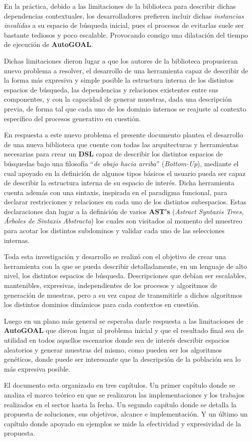 En la práctica, debido a las limitaciones de la biblioteca para describir dichas
dependencias contextuales, los desarrolladores prefieren incluir dichas {\it instancias
        invalidas} a su espacio de búsqueda inicial, pues el procesos de evitarlas suele
ser bastante tediosos y poco escalable. Provocando consigo una dilatación del
tiempo de ejecución de {\bf AutoGOAL}.

Dichas limitaciones dieron lugar a que los autores de la biblioteca propusieran
nuevo problema a resolver, el desarrollo de una herramienta capaz de describir de
la forma más expresiva y simple posible la estructura interna de los
distintos espacios de búsqueda, las dependencias y relaciones existentes entre sus
componentes, y con la capacidad de generar muestras, dada una descripción
previa, de forma tal que cada uno de los dominio internos se reajuste al contexto
específico del procesos generativo en cuestión.

En respuesta a este nuevo problema el presente documento plantea el desarrollo de una
nueva biblioteca que cuente con todas las arquitecturas y herramientas necesarias para
crear un {\bf DSL} capaz de describir los distintos espacios de búsquedas bajo una
filosofía ``{\it de abajo hacia arriba}'' ({\it Bottom-Up}), mediante el cual apoyado
en la definición de algunos tipos básicos el usuario pueda ser capaz de describir la
estructura interna de su espacio de interés. Dicha herramienta cuenta además con una
sintaxis, inspirada en el paradigma funcional, para declarar restricciones y
relaciones en cada uno de los distintos subespacios. Estas declaraciones dan lugar a la
definición de varios {\bf AST's} ({\it Astract Syntaxis Trees, Árboles de Sintaxis
        Abstracta}) los cuales son visitados al momento del muestreo para acotar los distintos
subdominos y validar cada uno de las selecciones internas.

Toda esta investigación y desarrollo se realizó con el objetivo de crear una
herramienta con la que se pueda describir detalladamente, en un lenguaje de alto nivel,
los distintos espacios de búsqueda. Descripciones que debían ser escalables, mantenibles,
expresivas, independientes de los procesos y algoritmos de generación de muestras, pero a
su vez capaz de transmitirle a dichos algoritmos los distintos dominios dinámicos para
cada contextos en cuestión.

Luego en un plano más general se esperaba darle respuesta a las limitaciones
de {\bf AutoGOAL} que dieron lugar al problema inicial y que el resultado final sea
de utilidad en todos aquellos escenarios donde sea de interés describir espacios
aleatorios y generar muestras del mismo, como pueden ser los algoritmos genéticos,
donde puede ser interesante que la descripción de la población sea lo más expresiva
posible.

El documento esta organizado en tres capítulos. Un primer capítulo donde se analiza
el marco teórico en que se realizaron las implementaciones y los trabajos realizados
en el sector hasta la fecha. Un segundo capítulo donde se detalla la propuesta de soluciones, sus
objetivos, alcance e implementación. Y un último un capítulo donde apoyado en ejemplos
se mide la efectividad y expresividad de la propuesta.
